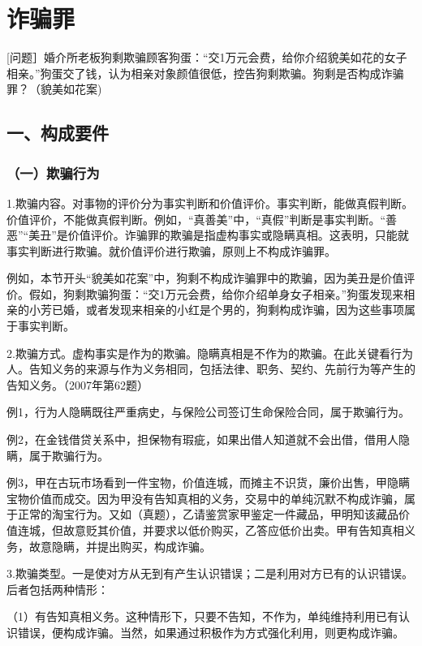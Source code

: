 \section{诈骗罪}

[问题］婚介所老板狗剩欺骗顾客狗蛋：“交1万元会费，给你介绍貌美如花的女子相亲。”狗蛋交了钱，认为相亲对象颜值很低，控告狗剩欺骗。狗剩是否构成诈骗罪？（貌美如花案)


\subsection*{一、构成要件}

\subsubsection*{（一）欺骗行为}

1.欺骗内容。对事物的评价分为事实判断和价值评价。事实判断，能做真假判断。价值评价，不能做真假判断。例如，“真善美”中，“真假”判断是事实判断。“善恶”“美丑”是价值评价。诈骗罪的欺骗是指虚构事实或隐瞒真相。这表明，只能就事实判断进行欺骗。就价值评价进行欺骗，原则上不构成诈骗罪。

例如，本节开头“貌美如花案”中，狗剩不构成诈骗罪中的欺骗，因为美丑是价值评价。假如，狗剩欺骗狗蛋：“交1万元会费，给你介绍单身女子相亲。”狗蛋发现来相亲的小芳已婚，或者发现来相亲的小红是个男的，狗剩构成诈骗，因为这些事项属于事实判断。

2.欺骗方式。虚构事实是作为的欺骗。隐瞒真相是不作为的欺骗。在此关键看行为人。告知义务的来源与作为义务相同，包括法律、职务、契约、先前行为等产生的告知义务。（2007年第62题）

例1，行为人隐瞒既往严重病史，与保险公司签订生命保险合同，属于欺骗行为。

例2，在金钱借贷关系中，担保物有瑕疵，如果出借人知道就不会出借，借用人隐瞒，属于欺骗行为。

例3，甲在古玩市场看到一件宝物，价值连城，而摊主不识货，廉价出售，甲隐瞒宝物价值而成交。因为甲没有告知真相的义务，交易中的单纯沉默不构成诈骗，属于正常的淘宝行为。又如（真题），乙请鉴赏家甲鉴定一件藏品，甲明知该藏品价值连城，但故意贬其价值，并要求以低价购买，乙答应低价出卖。甲有告知真相义务，故意隐瞒，并提出购买，构成诈骗。

3.欺骗类型。一是使对方从无到有产生认识错误；二是利用对方已有的认识错误。后者包括两种情形：

（1）有告知真相义务。这种情形下，只要不告知，不作为，单纯维持利用已有认识错误，便构成诈骗。当然，如果通过积极作为方式强化利用，则更构成诈骗。

